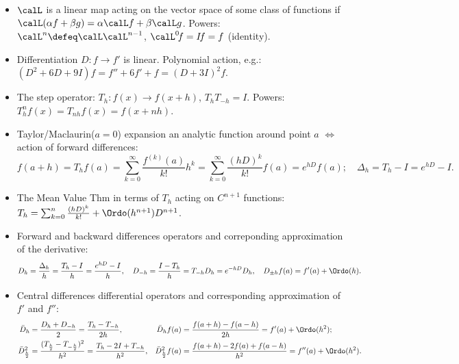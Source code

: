 \documentclass[a4paper]{article}
\begin{document}
\begin{itemize}

   \item $\calL$ is a linear map acting on the vector space of some class of functions if
     $\calL (\alpha f+\beta g)=\alpha\calL f+\beta\calL g$.
     Powers: $\calL^n\defeq\calL\calL^{n-1}$,
     $\calL^0\!f=I\!f=f$ (identity).

  \item Differentiation $D\!:\!f\to f'$ is linear.
  Polynomial action, e.g.: $(D^2+6D+9I)f=f''+6f'+f=(D+3I)^2f$.

  \item The step operator: $T_h\!:f(x)\to f(x+h)$,
    $T_hT_{-h}=I$. Powers: $T^n_hf(x)=T_{nh}f(x)=f(x+nh)$.

  \item Taylor/Maclaurin($a=0$) expansion an analytic function around  point $a$
    $\iff$
    action of forward differences:
    \[
      f(a+h)
      =T_hf(a)
      =\sum_{k=0}^\infty\frac{f^{(k)}(a)}{k!}h^k
      =\sum_{k=0}^\infty\frac{(hD)^k}{k!}f(a)
      = e^{hD}f(a); \quad
      \Delta_h=T_h-I=e^{hD}-I.
    \]

  \item The Mean Value Thm in terms of $T_h$ acting on $C^{n+1}$ functions:
    $
     T_h = \sum_{k=0}^n\frac{(hD)^k}{k!}
      + \Ordo(h^{n+1})D^{n+1}
    $.

  \item Forward and backward
    differences operators and correponding
    approximation of the derivative:
    \[
      D_h=\frac{\Delta_h}{h}=\frac{T_h-I}{h}=\frac{e^{hD}-I}{h},\quad
      D_{-h} =\frac{I-T_h}{h} = T_{-h}D_h=e^{-hD}D_h,
      \quad
      D_{\pm h}f(a)=f'(a) + \Ordo(h).
    \]

  \item Central
    differences differential operators and corresponding
    approximation of $f'$ and $f''$:
    \begin{align*}
      \bar D_h
      &= \frac{D_h+D_{-h}}{2}
      = \frac{T_h-T_{-h}}{2h},
      &
      \bar D_hf(a)
      &= \frac{f(a+h)-f(a-h)}{2h}
      = f'(a) + \Ordo(h^2);
      \\
      \bar D_{\frac h2}^2
      &= \frac{(T_{\frac h2}-T_{-\frac h2})^2}{h^2}
       = \frac{T_{h}-2I+T_{-h}}{h^2},
      &
      \bar D_{\frac h2}^2f(a)
       &= \frac{f(a+h)-2f(a)+f(a-h)}{h^2}
        = f''(a) + \Ordo(h^2).
    \end{align*}


\end{itemize}
\end{document}
